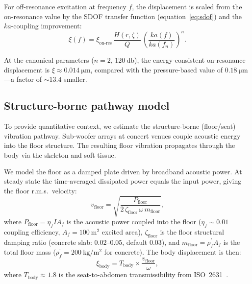 For off-resonance excitation at frequency $f$, the displacement is
scaled from the on-resonance value by the SDOF transfer function
(equation~\ref{eq:sdof}) and the $ka$-coupling improvement:
%
\begin{equation}
  \xi(f) = \xi_\mathrm{on\text{-}res} \,
    \frac{H(r,\zeta)}{Q} \,
    \left(\frac{ka(f)}{ka(f_n)}\right)^n.
  \label{eq:off-resonance}
\end{equation}

At the canonical parameters ($n = 2$, $\SI{120}{\decibel}$), the
energy-consistent on-resonance displacement is
$\xi \approx \SI{0.014}{\micro\metre}$, compared with the
pressure-based value of $\SI{0.18}{\micro\metre}$---a factor of
${\sim}\num{13.4}$ smaller.

\subsection{Structure-borne pathway model}
\label{sec:floor-pathway}

To provide quantitative context, we estimate the structure-borne
(floor/seat) vibration pathway.  Sub-woofer arrays at concert venues
couple acoustic energy into the floor structure.  The resulting floor
vibration propagates through the body via the skeleton and soft tissue.

We model the floor as a damped plate driven by broadband acoustic power.
At steady state the time-averaged dissipated power equals the input
power, giving the floor r.m.s.\ velocity:
%
\begin{equation}
  v_\mathrm{floor} = \sqrt{\frac{P_\mathrm{floor}}
    {2\,\zeta_\mathrm{floor}\,\omega\,m_\mathrm{floor}}},
  \label{eq:floor-velocity}
\end{equation}
%
where $P_\mathrm{floor} = \eta_f I A_f$ is the acoustic power coupled
into the floor ($\eta_f \sim 0.01$ coupling efficiency,
$A_f = \SI{100}{\metre\squared}$ excited area),
$\zeta_\mathrm{floor}$ is the floor structural damping ratio
(concrete slab: $0.02$--$0.05$, default $0.03$), and
$m_\mathrm{floor} = \rho_f^{\prime} A_f$ is the total floor mass
($\rho_f^{\prime} = \SI{200}{\kilogram\per\metre\squared}$ for concrete).
The body displacement is then:
%
\begin{equation}
  \xi_\mathrm{body} = T_\mathrm{body} \times
    \frac{v_\mathrm{floor}}{\omega},
  \label{eq:floor-pathway}
\end{equation}
%
where $T_\mathrm{body} \approx 1.8$ is the seat-to-abdomen
transmissibility from ISO~2631~\cite{Kitazaki1998, Griffin1990}.

